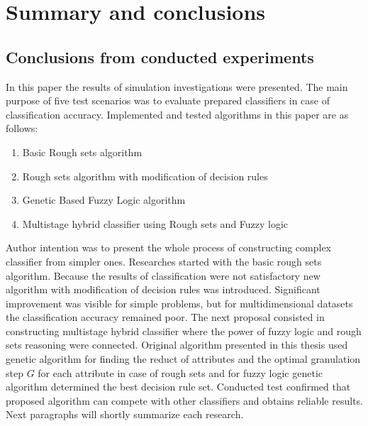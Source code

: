 \section{Summary and conclusions}
\label{cha:Summary}
\subsection{Conclusions from conducted experiments}
In this paper the results of simulation investigations were presented. The main
purpose of five test scenarios was to evaluate prepared classifiers in case of
classification accuracy. Implemented and tested algorithms in this paper are as follows:
\begin{enumerate}
    \item Basic Rough sets algorithm
    \item Rough sets algorithm with modification of decision rules
    \item Genetic Based Fuzzy Logic algorithm
    \item Multistage hybrid classifier using Rough sets and Fuzzy logic
\end{enumerate}
Author intention was to present the whole process of constructing complex
classifier from simpler ones. Researches started with the basic rough sets
algorithm. Because the results of classification were not satisfactory new
algorithm with modification of decision rules was introduced. Significant
improvement was visible for simple problems, but for multidimensional datasets
the classification accuracy remained poor. The next proposal consisted in
constructing multistage hybrid classifier where the power of fuzzy logic and
rough sets reasoning were connected. Original algorithm presented in this
thesis used genetic algorithm for finding the reduct of attributes and the
optimal granulation step $G$ for each attribute in case of rough sets and for
fuzzy logic genetic algorithm determined the best decision rule set. 
Conducted test confirmed that proposed algorithm can compete with other classifiers 
and obtains reliable results. Next paragraphs will shortly summarize each research. 


